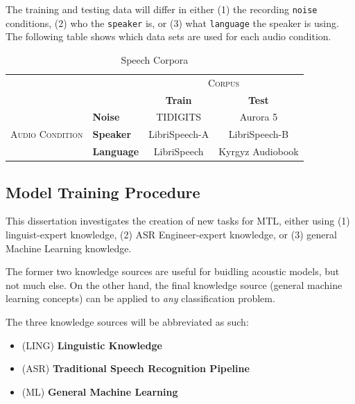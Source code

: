 \documentclass[10pt,a4paper]{article}
\begin{document}
The training and testing data will differ in either (1) the recording \texttt{noise} conditions, (2) who the \texttt{speaker} is, or (3) what \texttt{language} the speaker is using. The following table shows which data sets are used for each audio condition.


\begin{table}[htbp]
  \centering
  \begin{adjustbox}{width=.75\textwidth}
    \begin{tabular}{clcc}
      \toprule
      && \multicolumn{2}{c}{\textsc{Corpus}}\\
      && \textbf{Train} & \textbf{Test}\\
      \midrule
      \multirow{3}{*}{\textsc{Audio Condition}} &\textbf{Noise} & TIDIGITS & Aurora 5 \\
      &\textbf{Speaker} & LibriSpeech-A & LibriSpeech-B \\
      &\textbf{Language} & LibriSpeech & Kyrgyz Audiobook \\
      \bottomrule
    \end{tabular}
    \label{table:data}
  \end{adjustbox}
  
  \caption{Speech Corpora}
  
\end{table}


\subsection{Model Training Procedure}

This dissertation investigates the creation of new tasks for MTL, either using (1) linguist-expert knowledge, (2) ASR Engineer-expert knowledge, or (3) general Machine Learning knowledge.

The former two knowledge sources are useful for buidling acoustic models, but not much else. On the other hand, the final knowledge source (general machine learning concepts) can be applied to \textit{any} classification problem.

The three knowledge sources will be abbreviated as such:
  
\begin{itemize}
\item  (\textsc{LING}) \textbf{Linguistic Knowledge} 
\item (\textsc{ASR}) \textbf{Traditional Speech Recognition Pipeline}
\item (\textsc{ML}) \textbf{General Machine Learning}
\end{itemize}
\end{document}
